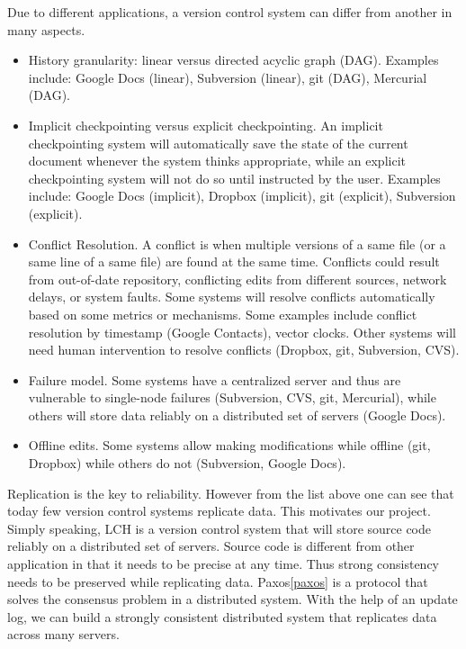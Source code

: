 \documentclass[11pt]{article}
\begin{document}
Due to different applications, a version control system can differ from another in many aspects.
\begin{itemize}
    \item History granularity: linear versus directed acyclic graph (DAG).
        Examples include: Google Docs (linear), Subversion (linear), git (DAG), Mercurial (DAG).
    \item Implicit checkpointing versus explicit checkpointing.
        An implicit checkpointing system will automatically save the state of the current document whenever the system thinks appropriate, while an explicit checkpointing system will not do so until instructed by the user.
        Examples include: Google Docs (implicit), Dropbox (implicit), git (explicit), Subversion (explicit).
    \item Conflict Resolution.
        A conflict is when multiple versions of a same file (or a same line of a same file) are found at the same time.
        Conflicts could result from out-of-date repository, conflicting edits from different sources, network delays, or system faults.
        Some systems will resolve conflicts automatically based on some metrics or mechanisms.
        Some examples include conflict resolution by timestamp (Google Contacts), vector clocks.
        Other systems will need human intervention to resolve conflicts (Dropbox, git, Subversion, CVS).
    \item Failure model.
        Some systems have a centralized server and thus are vulnerable to single-node failures (Subversion, CVS, git, Mercurial\footnotemark),
        while others will store data reliably on a distributed set of servers (Google Docs).
    \item Offline edits.
        Some systems allow making modifications while offline (git, Dropbox) while others do not (Subversion, Google Docs).
\end{itemize}

Replication is the key to reliability.
However from the list above one can see that today few version control systems replicate data.
This motivates our project.
Simply speaking, LCH is a version control system that will store source code reliably on a distributed set of servers.
Source code is different from other application in that it needs to be precise at any time.
Thus strong consistency needs to be preserved while replicating data.
Paxos\ref{paxos} is a protocol that solves the consensus problem in a distributed system.
With the help of an update log, we can build a strongly consistent distributed system that replicates data across many servers.
\end{document}
